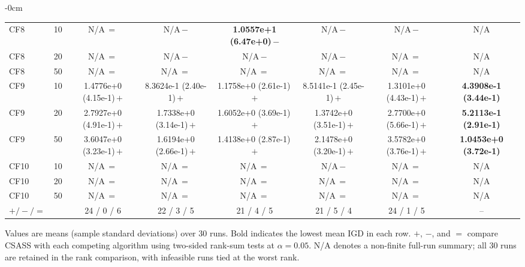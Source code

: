 \begin{table}[!htbp]
\begin{ROneBlock}
\begin{adjustwidth}{-\extralength}{0cm}
\begin{tabular*}{\linewidth}{@{\extracolsep{\fill}}llcccccc@{}}
CF8 & 10 & N/A\,$=$ & N/A\,$-$ & \textbf{1.0557e+1 (6.47e+0)}\,$-$ & N/A\,$-$ & N/A\,$-$ & N/A \\
CF8 & 20 & N/A\,$=$ & N/A\,$-$ & N/A\,$-$ & N/A\,$-$ & N/A\,$=$ & N/A \\
CF8 & 50 & N/A\,$=$ & N/A\,$=$ & N/A\,$=$ & N/A\,$=$ & N/A\,$=$ & N/A \\
CF9 & 10 & 1.4776e+0 (4.15e-1)\,$+$ & 8.3624e-1 (2.40e-1)\,$+$ & 1.1758e+0 (2.61e-1)\,$+$ & 8.5141e-1 (2.45e-1)\,$+$ & 1.3101e+0 (4.43e-1)\,$+$ & \textbf{4.3908e-1 (3.44e-1)} \\
CF9 & 20 & 2.7927e+0 (4.91e-1)\,$+$ & 1.7338e+0 (3.14e-1)\,$+$ & 1.6052e+0 (3.69e-1)\,$+$ & 1.3742e+0 (3.51e-1)\,$+$ & 2.7700e+0 (5.66e-1)\,$+$ & \textbf{5.2113e-1 (2.91e-1)} \\
CF9 & 50 & 3.6047e+0 (3.23e-1)\,$+$ & 1.6194e+0 (2.66e-1)\,$+$ & 1.4138e+0 (2.87e-1)\,$+$ & 2.1478e+0 (3.20e-1)\,$+$ & 3.5782e+0 (3.76e-1)\,$+$ & \textbf{1.0453e+0 (3.72e-1)} \\
CF10 & 10 & N/A\,$=$ & N/A\,$=$ & N/A\,$=$ & N/A\,$-$ & N/A\,$=$ & N/A \\
CF10 & 20 & N/A\,$=$ & N/A\,$=$ & N/A\,$=$ & N/A\,$=$ & N/A\,$=$ & N/A \\
CF10 & 50 & N/A\,$=$ & N/A\,$=$ & N/A\,$=$ & N/A\,$=$ & N/A\,$=$ & N/A \\
\midrule
$+/-/=$ & & 24 / 0 / 6 & 22 / 3 / 5 & 21 / 4 / 5 & 21 / 5 / 4 & 24 / 1 / 5 & -- \\
\bottomrule
\end{tabular*}
\vspace{3pt}
\parbox{\linewidth}{\footnotesize Values are means (sample standard deviations) over 30 runs. Bold indicates the lowest mean IGD in each row. $+$, $-$, and $=$ compare CSASS with each competing algorithm using two-sided rank-sum tests at $\alpha=0.05$. N/A denotes a non-finite full-run summary; all 30 runs are retained in the rank comparison, with infeasible runs tied at the worst rank.}
\end{adjustwidth}
\end{ROneBlock}
\end{table}
